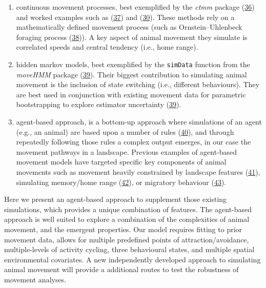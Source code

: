 \documentclass[10pt,a4paper]{article}
\begin{document}
\begin{enumerate}
\def\labelenumi{\arabic{enumi}.}
\item
  continuous movement processes, best exemplified by the \emph{ctmm} package (\protect\hyperlink{ref-Calabrese2016}{36}) and worked examples such as (\protect\hyperlink{ref-silva_autocorrelationinformed_2022}{37}) and (\protect\hyperlink{ref-theng_confronting_2022}{30}).
  These methods rely on a mathematically defined movement process (such as Ornstein--Uhlenbeck foraging process (\protect\hyperlink{ref-Fleming2014}{38})).
  A key aspect of animal movement they simulate is correlated speeds and central tendency (i.e., home range).
\item
  hidden markov models, best exemplified by the \texttt{simData} function from the \emph{moveHMM} package (\protect\hyperlink{ref-Michelot2016}{39}).
  Their biggest contribution to simulating animal movement is the inclusion of state switching (i.e., different behaviours).
  They are best used in conjunction with existing movement data for parametric bootstrapping to explore estimator uncertainty (\protect\hyperlink{ref-Michelot2016}{39}).
\item
  agent-based approach, is a bottom-up approach where simulations of an agent (e.g., an animal) are based upon a number of rules (\protect\hyperlink{ref-Tang2010}{40}), and through repeatedly following those rules a complex output emerges, in our case the movement pathways in a landscape.
  Previous examples of agent-based movement models have targeted specific key components of animal movements such as movement heavily constrained by landscape features (\protect\hyperlink{ref-quaglietta_simriv_2019}{41}), simulating memory/home range (\protect\hyperlink{ref-VanMoorter2009}{42}), or migratory behaviour (\protect\hyperlink{ref-bennett_modelling_2006}{43}).
\end{enumerate}

Here we present an agent-based approach to supplement those existing simulations, which provides a unique combination of features.
The agent-based approach is well suited to explore a combination of the complexities of animal movement, and the emergent properties.
Our model requires fitting to prior movement data, allows for multiple predefined points of attraction/avoidance, multiple-levels of activity cycling, three behavioural states, and multiple spatial environmental covariates.
A new independently developed approach to simulating animal movement will provide a additional routes to test the robustness of movement analyses.
\end{document}

